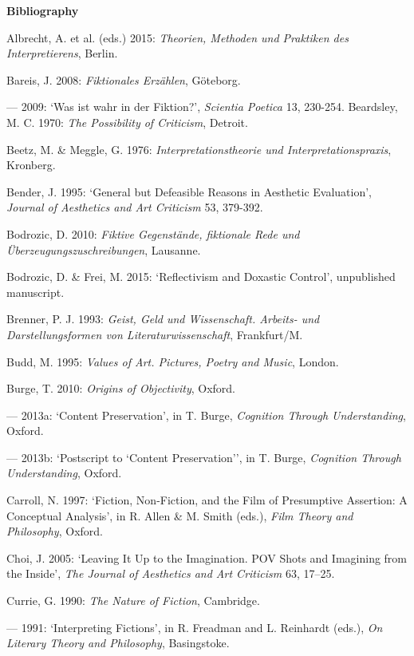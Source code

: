 \vspace{.2cm}
\noindent\textbf{\large Bibliography}
\vspace{.2cm}

\footnotesize
\linespread{1.0}

\begin{hangparas}{.5cm}{1}

Albrecht, A. et al. (eds.) 2015: \emph{Theorien, Methoden und Praktiken des Interpretierens}, Berlin.

Bareis, J. 2008: \emph{Fiktionales Erz\"ahlen}, G\"oteborg.

--- 2009: `Was ist wahr in der Fiktion?', \emph{Scientia Poetica} 13, 230-254. 
Beardsley, M. C. 1970: \emph{The Possibility of Criticism}, Detroit.

Beetz, M. \& Meggle, G. 1976: \emph{Interpretationstheorie und Interpretationspraxis}, Kronberg.

Bender, J. 1995: `General but Defeasible Reasons in Aesthetic Evaluation', \emph{Journal of Aesthetics and Art Criticism} 53, 379-392. 

Bodrozic, D. 2010: \emph{Fiktive Gegenst\"ande, fiktionale Rede und \"Uberzeugungszuschreibungen}, Lausanne.

Bodrozic, D. \& Frei, M. 2015: `Reflectivism and Doxastic Control', unpublished manuscript.

Brenner, P. J. 1993: \emph{Geist, Geld und Wissenschaft. Arbeits- und Darstellungsformen von Literaturwissenschaft}, Frankfurt/M.

Budd, M. 1995: \emph{Values of Art. Pictures, Poetry and Music}, London. 

Burge, T. 2010: \emph{Origins of Objectivity}, Oxford.

--- 2013a: `Content Preservation', in T. Burge, \emph{Cognition Through Understanding}, Oxford.

--- 2013b: `Postscript to `Content Preservation'', in T. Burge, \emph{Cognition Through Understanding}, Oxford.

Carroll, N. 1997: `Fiction, Non-Fiction, and the Film of Presumptive Assertion: A Conceptual Analysis', in R. Allen \& M. Smith (eds.), \emph{Film Theory and Philosophy}, Oxford.

Choi, J. 2005: `Leaving It Up to the Imagination. POV Shots and Imagining from the Inside', \emph{The Journal of Aesthetics and Art Criticism} 63, 17--25. 

Currie, G. 1990: \emph{The Nature of Fiction}, Cambridge. 

--- 1991: `Interpreting Fictions', in R. Freadman and L. Reinhardt (eds.), \emph{On Literary Theory and Philosophy}, Basingstoke. 


\end{hangparas}

